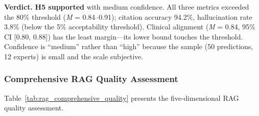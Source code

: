 \textbf{Verdict.} \textbf{H5 supported} with medium confidence. All three metrics exceeded the 80\% threshold (\textit{M} = 0.84--0.91); citation accuracy 94.2\%, hallucination rate 3.8\% (below the 5\% acceptability threshold). Clinical alignment (\textit{M} = 0.84, 95\% CI [0.80, 0.88]) has the least margin---its lower bound touches the threshold. Confidence is ``medium'' rather than ``high'' because the sample (50 predictions, 12 experts) is small and the scale subjective.


\subsubsection{Comprehensive RAG Quality Assessment}

Table~\ref{tab:rag_comprehensive_quality} presents the five-dimensional RAG quality assessment.

